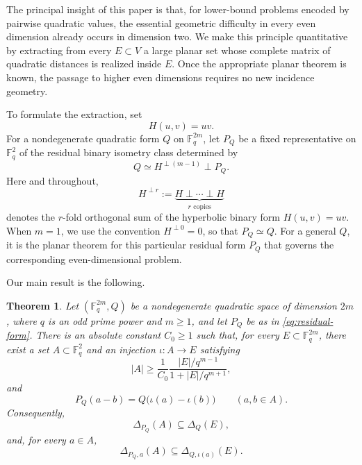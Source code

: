 \documentclass[11pt]{article}
\newtheorem{theorem}{Theorem}[section]
\newcommand{\F}{\mathbb F}
\begin{document}
The principal insight of this paper is that, for lower-bound problems
encoded by pairwise quadratic values, the essential geometric difficulty
in every even dimension already occurs in dimension two.  We make this
principle quantitative by extracting from every \(E\subset V\) a large
planar set whose complete matrix of quadratic distances is realized inside
\(E\).  Once the appropriate planar theorem is known, the passage to higher
even dimensions requires no new incidence geometry.

To formulate the extraction, set
\[
    H(u,v)=uv.
\]
For a nondegenerate quadratic form \(Q\) on \(\F_q^{2m}\), let \(P_Q\)
be a fixed representative on \(\F_q^2\) of the residual binary isometry
class determined by
\begin{equation}
\label{eq:residual-form}
    Q\simeq H^{\perp(m-1)}\perp P_Q.
\end{equation}
Here and throughout,
\[
    H^{\perp r}
    :=
    \underbrace{H\perp\cdots\perp H}_{r\text{ copies}}
\]
denotes the $r$-fold orthogonal sum of the hyperbolic binary form
$H(u,v)=uv$.
When \(m=1\), we use the convention \(H^{\perp0}=0\), so that
\(P_Q\simeq Q\).  For a general \(Q\), it is the planar theorem for this
particular residual form \(P_Q\) that governs the corresponding
even-dimensional problem.

Our main result is the following.

\begin{theorem} \label{maintheorem}
Let \((\F_q^{2m},Q)\) be a nondegenerate quadratic space of dimension
\(2m\), where \(q\) is an odd prime power and \(m\geq1\), and let \(P_Q\) be as in
\eqref{eq:residual-form}.  There is an absolute constant
\(C_0\geq1\) such that, for every
\(E\subset\F_q^{2m}\), there exist a set \(A\subset\F_q^2\) and an
injection \(\iota:A\to E\) satisfying
\begin{equation}
\label{eq:planar-extraction-size}
    |A|
    \geq
    \frac{1}{C_0}
    \frac{|E|/q^{m-1}}{1+|E|/q^{m+1}},
\end{equation}
and
\begin{equation}
\label{eq:planar-extraction-distance}
    P_Q(a-b)
    =
    Q\bigl(\iota(a)-\iota(b)\bigr)
    \qquad
    (a,b\in A).
\end{equation}
Consequently,
\[
    \Delta_{P_Q}(A)\subseteq\Delta_Q(E),
\]
and, for every \(a\in A\),
\[
    \Delta_{P_Q,a}(A)
    \subseteq
    \Delta_{Q,\iota(a)}(E).
\]
\end{theorem}
\end{document}
